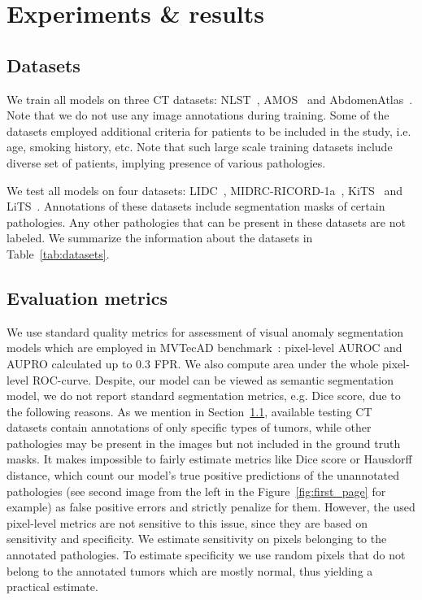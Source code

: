 
\section{Experiments \& results}
\label{sec:experiments}

\subsection{Datasets}
\label{subsec:datasets}





We train all models on three CT datasets: NLST~\cite{nlst}, AMOS~\cite{amos} and AbdomenAtlas~\cite{abdomen_atlas}. Note that we do not use any image annotations during training. Some of the datasets employed additional criteria for patients to be included in the study, i.e. age, smoking history, etc. Note that such large scale training datasets include diverse set of patients, implying presence of various pathologies.

We test all models on four datasets: LIDC~\cite{lidc}, MIDRC-RICORD-1a~\cite{midrc}, KiTS~\cite{kits} and LiTS~\cite{lits}. Annotations of these datasets include segmentation masks of certain pathologies. Any other pathologies that can be present in these datasets are not labeled.
We summarize the information about the datasets in Table~\ref{tab:datasets}.

\subsection{Evaluation metrics}
\label{subsec:metrics}

We use standard quality metrics for assessment of visual anomaly segmentation models which are employed in MVTecAD benchmark~\cite{mvtec}: pixel-level AUROC and AUPRO calculated up to $0.3$ FPR. We also compute area under the whole pixel-level ROC-curve. Despite, our model can be viewed as semantic segmentation model, we do not report standard segmentation metrics, e.g. Dice score, due to the following reasons. As we mention in Section~\ref{subsec:datasets}, available testing CT datasets contain annotations of only specific types of tumors, while other pathologies may be present in the images but not included in the ground truth masks. It makes impossible to fairly estimate metrics like Dice score or Hausdorff distance, which count our model's true positive predictions of the unannotated pathologies (see second image from the left in the Figure~\ref{fig:first_page} for example) as false positive errors and strictly penalize for them. However, the used pixel-level metrics are not sensitive to this issue, since they are based on sensitivity and specificity. We estimate sensitivity on pixels belonging to the annotated pathologies. To estimate specificity we use random pixels that do not belong to the annotated tumors which are mostly normal, thus yielding a practical estimate.

